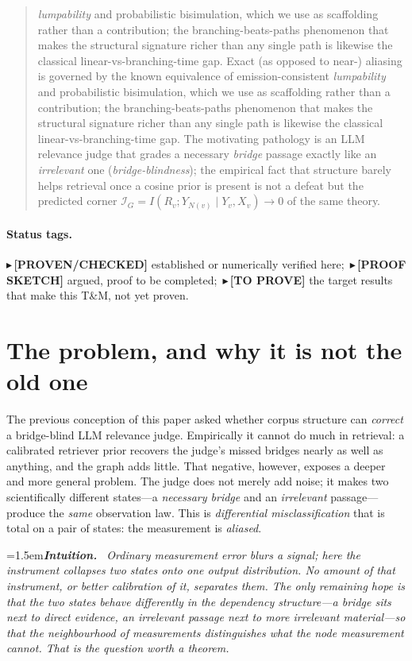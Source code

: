 \documentclass[11pt]{article}
\newcommand{\PROVEN}[1]{{\color{teal}\small$\blacktriangleright$\,\textbf{[PROVEN/CHECKED]} #1}}
\newcommand{\SKETCH}[1]{{\color{orange}\small$\blacktriangleright$\,\textbf{[PROOF SKETCH]} #1}}
\newcommand{\CONJ}[1]{{\color{violet}\small$\blacktriangleright$\,\textbf{[TO PROVE]} #1}}
\newenvironment{intuition}{\par\smallskip\noindent\hangindent=1.5em\textbf{\itshape Intuition.}\itshape\ \ignorespaces}{\par\smallskip}
\begin{document}
\begin{abstract}
\emph{lumpability} and probabilistic bisimulation, which we use as scaffolding rather than a contribution; the
branching-beats-paths phenomenon that makes the structural signature richer than any single path is likewise the
classical linear-vs-branching-time gap. Exact (as opposed to near-) aliasing is governed by the known equivalence of emission-consistent
\emph{lumpability} and probabilistic bisimulation, which we use as scaffolding rather than a contribution; the
branching-beats-paths phenomenon that makes the structural signature richer than any single path is likewise the
classical linear-vs-branching-time gap. The motivating pathology is an LLM relevance judge that grades a necessary
\emph{bridge} passage exactly like an \emph{irrelevant} one (\emph{bridge-blindness}); the empirical fact that
structure barely helps retrieval once a cosine prior is present is not a defeat but the predicted corner
$\mathcal I_G=I(R_v;Y_{N(v)}\mid Y_v,X_v)\to0$ of the same theory.
\end{abstract}

\paragraph{Status tags.} \PROVEN{} established or numerically verified here;\ \SKETCH{} argued, proof to be
completed;\ \CONJ{} the target results that make this T\&M, not yet proven.

\tableofcontents

\section{The problem, and why it is not the old one}
The previous conception of this paper asked whether corpus structure can \emph{correct} a bridge-blind LLM
relevance judge. Empirically it cannot do much in retrieval: a calibrated retriever prior recovers the judge's
missed bridges nearly as well as anything, and the graph adds little. That negative, however, exposes a deeper
and more general problem. The judge does not merely add noise; it makes two scientifically different states---a
\emph{necessary bridge} and an \emph{irrelevant} passage---produce the \emph{same} observation law. This is
\emph{differential misclassification} that is total on a pair of states: the measurement is \emph{aliased}.

\begin{intuition}
Ordinary measurement error blurs a signal; here the instrument \emph{collapses} two states onto one output
distribution. No amount of that instrument, or better calibration of it, separates them. The only remaining hope
is that the two states \emph{behave differently in the dependency structure}---a bridge sits next to direct
evidence, an irrelevant passage next to more irrelevant material---so that the \emph{neighbourhood} of
measurements distinguishes what the node measurement cannot. That is the question worth a theorem.
\end{intuition}
\end{document}
